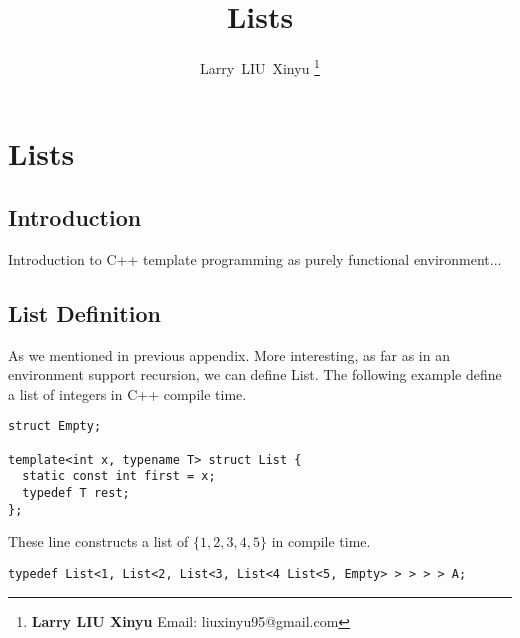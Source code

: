 \documentclass{article}
\begin{document}
\fi


\title{Lists}

\author{Larry~LIU~Xinyu
\thanks{{\bfseries Larry LIU Xinyu } \newline
  Email: liuxinyu95@gmail.com \newline}
  }


\maketitle

\ifx\wholebook\relax
\chapter{Lists}
\fi

\section{Introduction}
\label{introduction}

Introduction to C++ template programming as purely functional environment...


\section{List Definition}

As we mentioned in previous appendix.
More interesting, as far as in an environment support recursion, we can define List. The following
example define a list of integers in C++ compile time.

\lstset{language=C++}
\begin{lstlisting}
struct Empty;

template<int x, typename T> struct List {
  static const int first = x;
  typedef T rest;
};
\end{lstlisting}

These line constructs a list of $\{1, 2, 3, 4, 5\}$ in compile time.

\begin{lstlisting}
typedef List<1, List<2, List<3, List<4 List<5, Empty> > > > > A;
\end{lstlisting}
\end{document}
